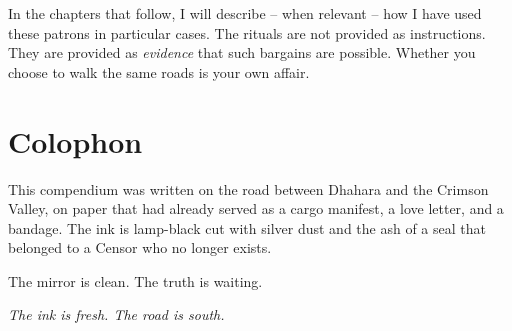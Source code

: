 \documentclass[10pt,twoside]{book}
\begin{document}
In the chapters that follow, I will describe -- when relevant -- how I have used these patrons in particular cases. The rituals are not provided as instructions. They are provided as \emph{evidence} that such bargains are possible. Whether you choose to walk the same roads is your own affair.

\tableofcontents
\newpage











\chapter*{Colophon}
This compendium was written on the road between Dhahara and the Crimson Valley, on paper that had already served as a cargo manifest, a love letter, and a bandage. The ink is lamp-black cut with silver dust and the ash of a seal that belonged to a Censor who no longer exists.

The mirror is clean. The truth is waiting.

\vspace{0.5cm}
\noindent
\textit{The ink is fresh. The road is south.}


\end{document}
